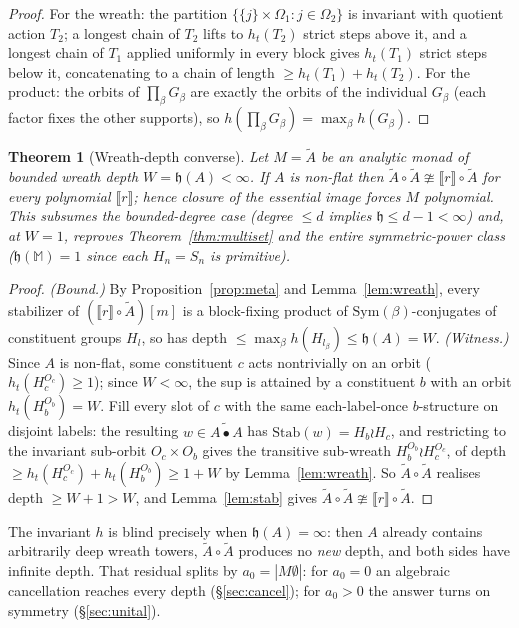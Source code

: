 \documentclass[11pt]{amsart}
\theoremstyle{plain}
\newtheorem{theorem}{Theorem}[section]
\theoremstyle{definition}
\newcommand{\ext}[1]{\llbracket #1 \rrbracket}
\begin{document}
\begin{proof}
For the wreath: the partition $\{\{j\}\times\Omega_1:j\in\Omega_2\}$ is invariant with quotient action
$T_2$; a longest chain of $T_2$ lifts to $h_t(T_2)$ strict steps above it, and a longest chain of
$T_1$ applied uniformly in every block gives $h_t(T_1)$ strict steps below it, concatenating to a chain
of length $\ge h_t(T_1)+h_t(T_2)$. For the product: the orbits of $\prod_\beta G_\beta$ are exactly the
orbits of the individual $G_\beta$ (each factor fixes the other supports), so
$h(\prod_\beta G_\beta)=\max_\beta h(G_\beta)$.
\end{proof}

\begin{theorem}[Wreath-depth converse]\label{thm:Sprime}
Let $M=\tilde A$ be an analytic monad of bounded wreath depth $W=\mathfrak h(A)<\infty$. If $A$ is
non-flat then $\tilde A\circ\tilde A\ncong\ext r\circ\tilde A$ for every polynomial $\ext r$; hence
closure of the essential image forces $M$ polynomial. This subsumes the bounded-degree case (degree
$\le d$ implies $\mathfrak h\le d-1<\infty$) and, at $W=1$, reproves Theorem~\ref{thm:multiset} and the
entire symmetric-power class ($\mathfrak h(\mathbb M)=1$ since each $H_n=S_n$ is primitive).
\end{theorem}

\begin{proof}
\emph{(Bound.)} By Proposition~\ref{prop:meta} and Lemma~\ref{lem:wreath}, every stabilizer of
$(\ext r\circ\tilde A)[m]$ is a block-fixing product of $\mathrm{Sym}(\beta)$-conjugates of constituent
groups $H_l$, so has depth $\le\max_\beta h(H_{l_\beta})\le\mathfrak h(A)=W$.
\emph{(Witness.)} Since $A$ is non-flat, some constituent $c$ acts nontrivially on an orbit
($h_t(H_c^{O_c})\ge1$); since $W<\infty$, the sup is attained by a constituent $b$ with an orbit
$h_t(H_b^{O_b})=W$. Fill every slot of $c$ with the same each-label-once $b$-structure on disjoint
labels: the resulting $w\in\widetilde{A\bullet A}$ has $\mathrm{Stab}(w)=H_b\wr H_c$, and restricting to
the invariant sub-orbit $O_c\times O_b$ gives the transitive sub-wreath $H_b^{O_b}\wr H_c^{O_c}$, of
depth $\ge h_t(H_c^{O_c})+h_t(H_b^{O_b})\ge1+W$ by Lemma~\ref{lem:wreath}. So $\tilde A\circ\tilde A$
realises depth $\ge W+1>W$, and Lemma~\ref{lem:stab} gives $\tilde A\circ\tilde A\ncong\ext r\circ\tilde A$.
\end{proof}

The invariant $h$ is blind precisely when $\mathfrak h(A)=\infty$: then $A$ already contains
arbitrarily deep wreath towers, $\tilde A\circ\tilde A$ produces no \emph{new} depth, and both sides
have infinite depth. That residual splits by $a_0=|M\emptyset|$: for $a_0=0$ an algebraic cancellation
reaches every depth (\S\ref{sec:cancel}); for $a_0>0$ the answer turns on symmetry
(\S\ref{sec:unital}).
\end{document}
